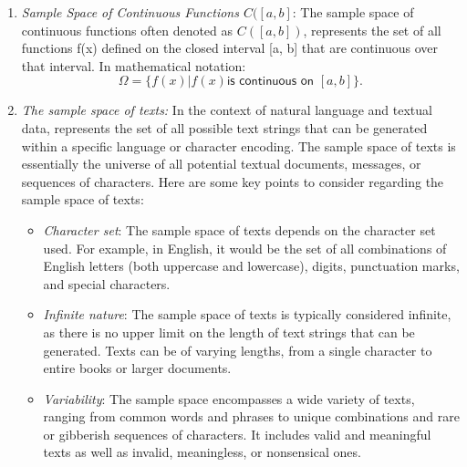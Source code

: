 \documentclass{tufte-handout}
\begin{document}
\begin{enumerate}
\item \textit{Sample Space of Continuous Functions $C([a, b]$}: The sample space of continuous functions often denoted as $C([a, b])$, represents the set of all functions f(x) defined on the closed interval [a, b] that are continuous over that interval. In mathematical notation:
$$\Omega = \{f(x) | f(x) \textsf{is continuous on $[a, b]$}\}.$$
\item \textit{The sample space of texts:} In the context of natural language and textual data, represents the set of all possible text strings that can be generated within a specific language or character encoding. The sample space of texts is essentially the universe of all potential textual documents, messages, or sequences of characters. Here are some key points to consider regarding the sample space of texts:

\begin{itemize}

\item \textit{Character set}: The sample space of texts depends on the character set used. For example, in English, it would be the set of all combinations of English letters (both uppercase and lowercase), digits, punctuation marks, and special characters.

\item \textit{Infinite nature}: The sample space of texts is typically considered infinite, as there is no upper limit on the length of text strings that can be generated. Texts can be of varying lengths, from a single character to entire books or larger documents.

\item \textit{Variability}: The sample space encompasses a wide variety of texts, ranging from common words and phrases to unique combinations and rare or gibberish sequences of characters. It includes valid and meaningful texts as well as invalid, meaningless, or nonsensical ones.


\end{itemize}
\end{enumerate}
\end{document}
